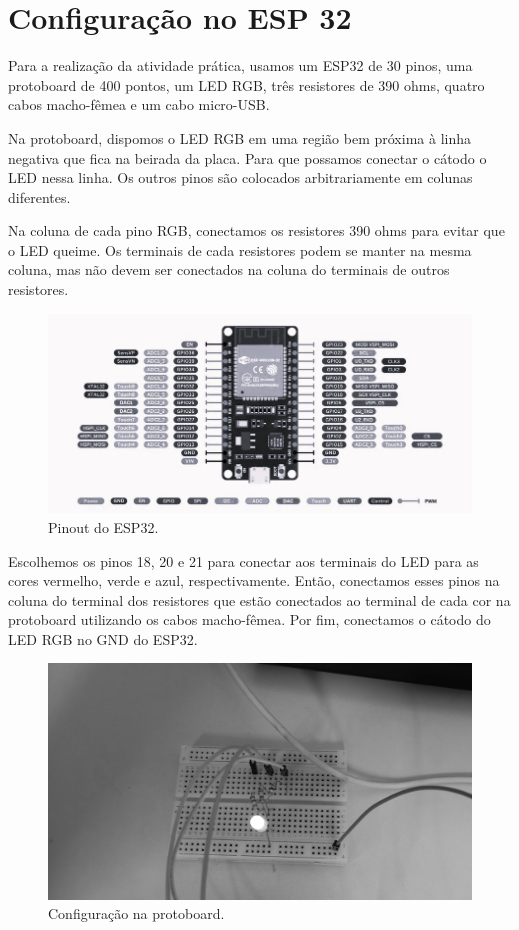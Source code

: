 \section{Configuração no ESP 32}

Para a realização da atividade prática, usamos um ESP32 de 30 pinos, uma protoboard de 400 pontos, um LED RGB, três resistores de 390 ohms, quatro cabos macho-fêmea e um cabo micro-USB.

Na protoboard, dispomos o LED RGB em uma região bem próxima à linha negativa que fica na beirada da placa. Para que possamos conectar o cátodo o LED nessa linha. Os outros pinos são colocados arbitrariamente em colunas diferentes.

Na coluna de cada pino RGB, conectamos os resistores 390 ohms para evitar que o LED queime. Os terminais de cada resistores podem se manter na mesma coluna, mas não devem ser conectados na coluna do terminais de outros resistores.

\begin{figure}[H]
    \centering
    \includegraphics[width=0.5\linewidth]{img/esp32_pinout.png}
    \caption{Pinout do ESP32.}
    \label{fig:esp32-pinout}
\end{figure}

Escolhemos os pinos 18, 20 e 21 para conectar aos terminais do LED para as cores vermelho, verde e azul, respectivamente. Então, conectamos esses pinos na coluna do terminal dos resistores que estão conectados ao terminal de cada cor na protoboard utilizando os cabos macho-fêmea. Por fim, conectamos o cátodo do LED RGB no GND do ESP32.

\begin{figure}[H]
    \centering
    \includegraphics[width=0.5\linewidth]{img/protoboard_config.jpg}
    \caption{Configuração na protoboard.}
    \label{fig:protoboard-config}
\end{figure}